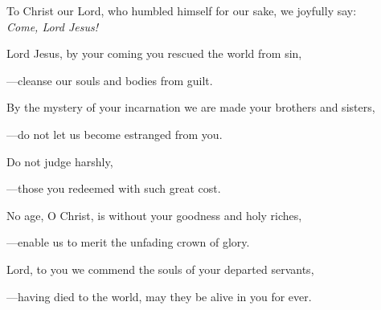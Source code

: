 \intercessions\indent

\begin{hangpar}

To Christ our Lord, who humbled himself for our sake, we joyfully say:\\
\emph{Come, Lord Jesus!}

\medskip Lord Jesus, by your coming you rescued the world from sin,

{\color{red}---\thinspace}cleanse our souls and bodies from guilt.

\medskip By the mystery of your incarnation we are made your brothers and sisters,

{\color{red}---\thinspace}do not let us become estranged from you. 

\medskip Do not judge harshly,

{\color{red}---\thinspace}those you redeemed with such great cost. 

\medskip No age, O Christ, is without your goodness and holy riches,

{\color{red}---\thinspace}enable us to merit the unfading crown of glory.

\medskip Lord, to you we commend the souls of your departed servants,

{\color{red}---\thinspace}having died to the world, may they be alive in you for ever.

\end{hangpar}